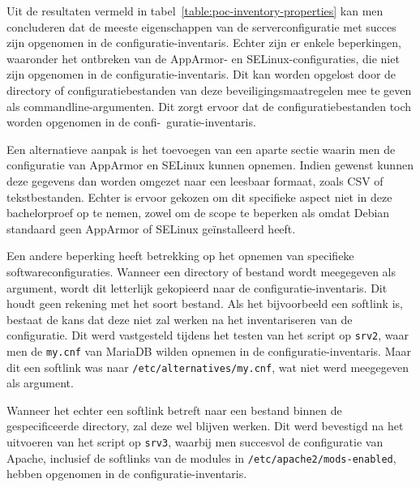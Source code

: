 Uit de resultaten vermeld in tabel~\ref{table:poc-inventory-properties} kan men concluderen dat de meeste eigenschappen van de serverconfiguratie met succes zijn opgenomen in de configuratie-inventaris.
Echter zijn er enkele beperkingen, waaronder het ontbreken van de AppArmor- en SELinux-configuraties, die niet zijn opgenomen in de configuratie-inventaris.
Dit kan worden opgelost door de directory of configuratiebestanden van deze beveiligingsmaatregelen mee te geven als commandline-argumenten.
Dit zorgt ervoor dat de configuratiebestanden toch worden opgenomen in de confi-\ guratie-inventaris.

Een alternatieve aanpak is het toevoegen van een aparte sectie waarin men de configuratie van AppArmor en SELinux kunnen opnemen.
Indien gewenst kunnen deze gegevens dan worden omgezet naar een leesbaar formaat, zoals CSV of tekstbestanden.
Echter is ervoor gekozen om dit specifieke aspect niet in deze bachelorproef op te nemen, zowel om de scope te beperken als omdat Debian standaard geen AppArmor of SELinux ge\"installeerd heeft.

Een andere beperking heeft betrekking op het opnemen van specifieke softwareconfiguraties.
Wanneer een directory of bestand wordt meegegeven als argument, wordt dit letterlijk gekopieerd naar de configuratie-inventaris.
Dit houdt geen rekening met het soort bestand.
Als het bijvoorbeeld een softlink is, bestaat de kans dat deze niet zal werken na het inventariseren van de configuratie.
Dit werd vastgesteld tijdens het testen van het script op \texttt{srv2}, waar men de \texttt{my.cnf} van MariaDB wilden opnemen in de configuratie-inventaris.
Maar dit een softlink was naar \texttt{/etc/alternatives/my.cnf}, wat niet werd meegegeven als argument.

Wanneer het echter een softlink betreft naar een bestand binnen de gespecificeerde directory, zal deze wel blijven werken.
Dit werd bevestigd na het uitvoeren van het script op \texttt{srv3}, waarbij men succesvol de configuratie van Apache, inclusief de softlinks van de modules in \texttt{/etc/apache2/mods-enabled}, hebben opgenomen in de configuratie-inventaris.

